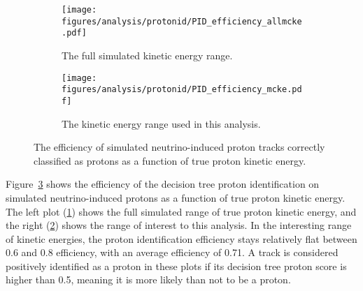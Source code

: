     \begin{figure}[h]
      \centering
      \begin{subfigure}[t]{2.8in}
        \texttt{[image: figures/analysis/protonid/PID\_efficiency\_allmcke.pdf]}
        \caption{The full simulated kinetic energy range.}
        \label{fig:pideffkeall}
      \end{subfigure}
      \hspace{2pt}
      \begin{subfigure}[t]{2.8in}
        \texttt{[image: figures/analysis/protonid/PID\_efficiency\_mcke.pdf]}
        \caption{The kinetic energy range used in this analysis.}
        \label{fig:pideffkerng}
      \end{subfigure}
      \caption{The efficiency of simulated neutrino-induced proton tracks
        correctly classified as protons as a function of true proton kinetic energy.}
      \label{fig:pideffke}
    \end{figure}
    Figure~\ref{fig:pideffke} shows the efficiency of the decision tree proton
    identification on simulated neutrino-induced protons as a function of true
    proton kinetic energy. The left plot (\ref{fig:pideffkeall}) shows the full
    simulated range of true proton kinetic energy, and the right
    (\ref{fig:pideffkerng}) shows the range of interest to this analysis. In
    the interesting range of kinetic energies, the proton identification
    efficiency stays relatively flat between 0.6 and 0.8 efficiency, with an
    average efficiency of 0.71. A track is considered positively identified as
    a proton in these plots if its decision tree proton score is higher than
    0.5, meaning it is more likely than not to be a proton.

